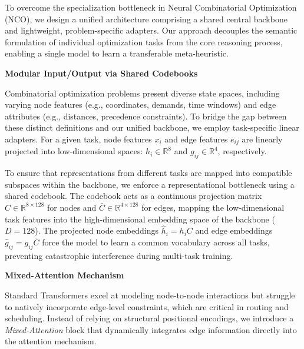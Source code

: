 \noindent To overcome the specialization bottleneck in Neural Combinatorial Optimization (NCO), we design a unified architecture comprising a shared central backbone and lightweight, problem-specific adapters. Our approach decouples the semantic formulation of individual optimization tasks from the core reasoning process, enabling a single model to learn a transferable meta-heuristic. 

\vspace{1em}
\noindent\textbf{Modular Input/Output via Shared Codebooks}
\vspace{0.5em}

\noindent Combinatorial optimization problems present diverse state spaces, including varying node features (e.g., coordinates, demands, time windows) and edge attributes (e.g., distances, precedence constraints). To bridge the gap between these distinct definitions and our unified backbone, we employ task-specific linear adapters. For a given task, node features $x_i$ and edge features $e_{ij}$ are linearly projected into low-dimensional spaces: $h_i \in \mathbb{R}^8$ and $g_{ij} \in \mathbb{R}^4$, respectively. 

\vspace{0.5em}
\noindent To ensure that representations from different tasks are mapped into compatible subspaces within the backbone, we enforce a representational bottleneck using a shared codebook. The codebook acts as a continuous projection matrix $C \in \mathbb{R}^{8 \times 128}$ for nodes and $\bar{C} \in \mathbb{R}^{4 \times 128}$ for edges, mapping the low-dimensional task features into the high-dimensional embedding space of the backbone ($D=128$). The projected node embeddings $\hat{h}_i = h_i C$ and edge embeddings $\hat{g}_{ij} = g_{ij} \bar{C}$ force the model to learn a common vocabulary across all tasks, preventing catastrophic interference during multi-task training.

\vspace{1em}
\noindent\textbf{Mixed-Attention Mechanism}
\vspace{0.5em}

\noindent Standard Transformers excel at modeling node-to-node interactions but struggle to natively incorporate edge-level constraints, which are critical in routing and scheduling. Instead of relying on structural positional encodings, we introduce a \textit{Mixed-Attention} block that dynamically integrates edge information directly into the attention mechanism. 

